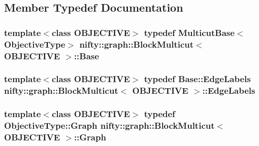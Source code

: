 \subsection{Member Typedef Documentation}
\hypertarget{classnifty_1_1graph_1_1BlockMulticut_a6ca8b03b1ff07bfcbc7a76b7c0b5dbda}{}
\subsubsection[{Base}]{\setlength{\rightskip}{0pt plus 5cm}template$<$class O\+B\+J\+E\+C\+T\+I\+V\+E$>$ typedef {\bf Multicut\+Base}$<${\bf Objective\+Type}$>$ {\bf nifty\+::graph\+::\+Block\+Multicut}$<$ O\+B\+J\+E\+C\+T\+I\+V\+E $>$\+::{\bf Base}}\label{classnifty_1_1graph_1_1BlockMulticut_a6ca8b03b1ff07bfcbc7a76b7c0b5dbda}
\hypertarget{classnifty_1_1graph_1_1BlockMulticut_a5aaec5810245dab0540ea428f771eeb2}{}
\subsubsection[{Edge\+Labels}]{\setlength{\rightskip}{0pt plus 5cm}template$<$class O\+B\+J\+E\+C\+T\+I\+V\+E$>$ typedef {\bf Base\+::\+Edge\+Labels} {\bf nifty\+::graph\+::\+Block\+Multicut}$<$ O\+B\+J\+E\+C\+T\+I\+V\+E $>$\+::{\bf Edge\+Labels}}\label{classnifty_1_1graph_1_1BlockMulticut_a5aaec5810245dab0540ea428f771eeb2}
\hypertarget{classnifty_1_1graph_1_1BlockMulticut_a5b1f16a5619ee57423c662797066b4ab}{}
\subsubsection[{Graph}]{\setlength{\rightskip}{0pt plus 5cm}template$<$class O\+B\+J\+E\+C\+T\+I\+V\+E$>$ typedef Objective\+Type\+::\+Graph {\bf nifty\+::graph\+::\+Block\+Multicut}$<$ O\+B\+J\+E\+C\+T\+I\+V\+E $>$\+::{\bf Graph}}\label{classnifty_1_1graph_1_1BlockMulticut_a5b1f16a5619ee57423c662797066b4ab}
\hypertarget{classnifty_1_1graph_1_1BlockMulticut_aa4c491df2afb630fd1a9897a2bc24d89}{}
